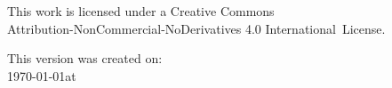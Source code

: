 {  \ifafive \vspace{0.5cm} \fi
  \ifninebythirteen \vspace{0.3cm} \fi
  \ifbfive \vspace{0.5cm} \fi

  This work is licensed under a Creative Commons\\
  Attribution-NonCommercial-NoDerivatives 4.0 International~License.


  \ifafive  \vspace{0.5cm} \fi
  \ifninebythirteen \vspace{0.3cm} \fi
  \ifbfive \vspace{0.5cm} \fi

  \ifdigital
    This version was created on:\\
    \today \space at \currenttime\\
  \fi

  \ifafive \vspace{0.5cm} \fi
  \ifninebythirteen \vspace{0.15cm} \fi
  \ifbfive \vspace{0.5cm} \fi

  \theEditionInfo

}

\ifdigital

\else

\clearpage

\fi


